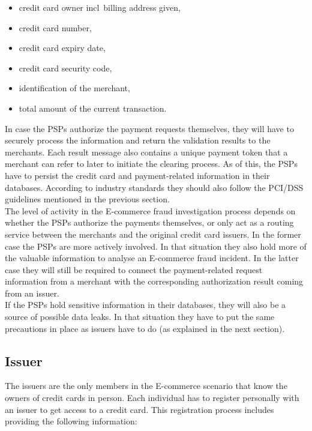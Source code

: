 \begin{itemize}
		\item credit card owner \gls{incl}\ billing address given,
		\item credit card number,
		\item credit card expiry date,
		\item credit card security code,
		\item identification of the merchant,
		\item total amount of the current transaction.
\end{itemize}

In case the \gls{PSP}s authorize the payment requests themselves, they will have to securely process the information and return the validation results to the merchants. Each result message also contains a unique payment token that a merchant can refer to later to initiate the clearing process. As of this, the \gls{PSP}s have to persist the credit card and payment-related information in their databases. According to industry standards they should also follow the \gls{PCI/DSS} guidelines mentioned in the previous section. \\

The level of activity in the \gls{E-commerce} fraud investigation process depends on whether the \gls{PSP}s authorize the payments themselves, or only act as a routing service between the merchants and the original credit card issuers. In the former case the \gls{PSP}s are more actively involved. In that situation they also hold more of the valuable information to analyse an \gls{E-commerce} fraud incident. In the latter case they will still be required to connect the payment-related request information from a merchant with the corresponding authorization result coming from an issuer. \\

If the \gls{PSP}s hold sensitive information in their databases, they will also be a source of possible data leaks. In that situation they have to put the same precautions in place as issuers have to do (as explained in the next section).


\subsection{Issuer}
\label{subsec:stakeholder_issuer}

The issuers are the only members in the \gls{E-commerce} scenario that know the owners of credit cards in person. Each individual has to register personally with an issuer to get access to a credit card. This registration process includes providing the following information: \@

